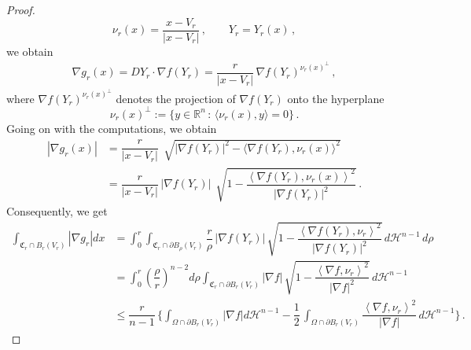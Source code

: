 \documentclass[a4paper,reqno,11pt]{amsart}
\newcommand{\R}{\mathbb{R}}
\newcommand{\C}{{\mathfrak C}}
\newcommand{\Hau}{{\mathcal H}} %
\newcommand{\de}{\partial}
\begin{document}
\begin{proof}
		\begin{equation*}
			\nu_{r}(x) = \dfrac{x - V_r}{|x - V_r|} \, , \qquad Y_{r} = Y_{r}(x) \, , 
		\end{equation*}
		we obtain
		\begin{align*}
			\nabla g_{r} (x) = D Y_{r} \cdot \nabla f (Y_r)
			= \dfrac{r}{|x - V_r|} \, \nabla f(Y_{r})^{\nu_{r}(x)^\perp} \, ,
		\end{align*}
		where $\nabla f(Y_r)^{\nu_{r}(x)^\perp}$ denotes the projection of $\nabla f(Y_r)$ onto the hyperplane
		\begin{equation*}
			\nu_r(x)^{\perp} := \{ y \in \R^n \, : \, \langle \nu_r(x) , y \rangle = 0 \} \, .
		\end{equation*}
Going on with the computations, we obtain
\begin{align*}
|\nabla g_{r} (x)| & = \dfrac{r}{|x - V_r|} \, \sqrt[]{|\nabla f (Y_r)|^{2} - \langle \nabla f(Y_r) , \nu_r(x) \rangle^{2} } \\
& = \dfrac{r}{|x - V_r|} \, \left| \nabla f (Y_r) \right| \, \sqrt[]{1 - \dfrac{\left \langle \nabla f (Y_r), \nu_r(x) \right \rangle^{2}}{|\nabla f (Y_r)|^{2}}}  \, . 
\end{align*}
Consequently, we get
\begin{align} \label{eq:estintnormnablafr}
\int_{\C_r \cap B_{r}(V_r)} |\nabla g_r| dx & = \int_{0}^{r} \int_{\C_{r} \cap \de B_{\rho}(V_r)} \dfrac{r}{\rho} \, \left| \nabla f (Y_r) \right| \, \sqrt{1 - \dfrac{\left \langle \nabla f (Y_r), \nu_r \right \rangle^{2}}{|\nabla f (Y_r)|^{2}}} \, d \Hau^{n-1} \, d \rho \nonumber 
\\
			& = \int_{0}^{r} \left( \dfrac{\rho}{r} \right)^{n-2} d \rho \int_{\C_{r} \cap \de B_{r}(V_r)} \left| \nabla f  \right| \, \sqrt{1 - \dfrac{\left \langle \nabla f , \nu_r \right \rangle^{2}}{|\nabla f |^{2}}} \, d \Hau^{n-1} \nonumber \\
			& \leq \dfrac{r}{n-1} \, \Bigg\{ \int_{\Omega \cap \de B_{r}(V_r)} |\nabla f | d \Hau^{n-1} - \dfrac{1}{2} \, \int_{\Omega \cap \de B_{r}(V_r)} \dfrac{\left \langle \nabla f , \nu_r \right \rangle^{2}}{|\nabla f|} \, d \Hau^{n-1} \Bigg\} \, . 
\end{align}
		

\end{proof}
\end{document}
